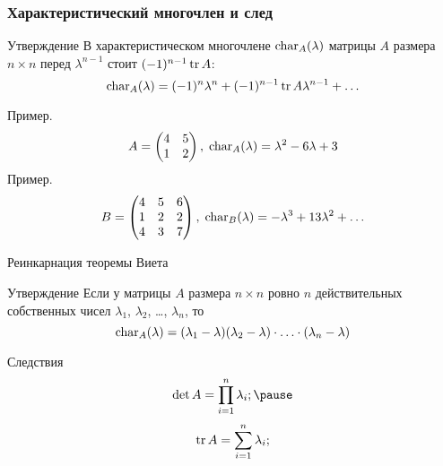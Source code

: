 \begin{frame}
    \frametitle{Характеристический многочлен и след}


    \begin{block}{Утверждение}
        В характеристическом многочлене $\operatorname{char}_A(\lambda)$ матрицы $A$ размера $n\times n$ 
        перед $\lambda^{n-1}$ стоит $(-1)^{n-1} \trace A$:
        \[
            \charp_A(\lambda) = (-1)^n \lambda^n  + (-1)^{n-1}\trace A \lambda^{n-1} + \ldots 
        \]
        
    \end{block}
    \pause

    Пример. 
    \[
        A= \begin{pmatrix}
            4 & 5 \\
            1 & 2 \\
        \end{pmatrix}, \; \operatorname{char}_A(\lambda) = \lambda^2 - 6 \lambda + 3
    \]
    \pause
    Пример.
\[
    B= \begin{pmatrix}
        4 & 5 & 6 \\
        1 & 2 & 2 \\
        4 & 3 & 7 \\
    \end{pmatrix}, \; \operatorname{char}_B(\lambda) = -\lambda^3 + 13 \lambda^2 + \ldots 
\]


\end{frame}



\begin{frame}{Реинкарнация теоремы Виета}
\begin{block}{Утверждение}
    Если у матрицы $A$ размера $n\times n$ ровно $n$ действительных собственных чисел $\lambda_1$, 
    $\lambda_2$, \ldots, $\lambda_n$, то \pause
    \[
    \operatorname{char}_A(\lambda) = (\lambda_1 - \lambda) (\lambda_2 - \lambda) \cdot \ldots \cdot (\lambda_n - \lambda)
    \]
\end{block}
\pause
\begin{block}{Следствия}
\[
\det A = \prod_{i=1}^n \lambda_i; \pause
\]
\[
\trace A = \sum_{i=1}^n \lambda_i; 
\]    
\end{block}


\end{frame}

